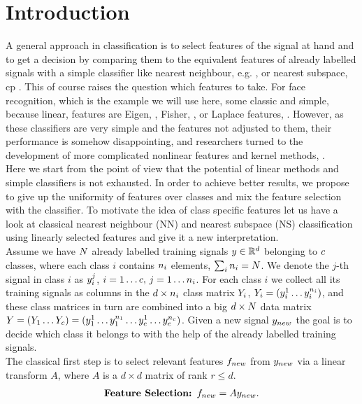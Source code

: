 \documentclass[11pt]{article}
\begin{document}
\section{Introduction}
A general approach in classification is to select features of the signal at hand and to get a decision by comparing them to the equivalent features of already labelled signals with a simple classifier like nearest neighbour, e.g. \cite{brpo93}, or nearest subspace, cp \cite{lehokr05}. This of course raises the question which features to take. For face recognition, which is the example we will use here, some classic and simple, because linear, features are Eigen, \cite{eigenfaces}, Fisher, \cite{lda}, or Laplace features, \cite{laplacefaces}.
However, as these classifiers are very simple and the features not adjusted to them, their performance is somehow disappointing, and researchers turned to the development of more complicated nonlinear features and kernel methods, \cite{liu06,phsc07}.\\
Here we start from the point of view that the potential of linear methods and simple classifiers is not exhausted. In order to achieve better results, we propose to give up the uniformity of features over classes and mix the feature selection with the classifier. To motivate the idea of class specific features let us have a look at classical nearest neighbour (NN) and nearest subspace (NS) classification using linearly selected features and give it a new interpretation.\\
Assume we have ${N}$ already labelled training signals ${y}\in{\mathbb{R}}^{d}$ belonging to ${c}$ classes, where each class $i$ contains ${n}_i$ elements, \ie $\sum_i {n}_i={N}$. We denote the $j$-th signal in class $i$ as ${y}_i^j$, $i=1\ldots {c}, \, j=1\ldots {n}_i$. For each class $i$ we collect all its training signals as columns in the ${d}\times {n}_i$ class matrix ${Y}_i$, \ie ${Y}_i=({y}_i^1\ldots {y}_i^{{n}_i})$, and these class matrices in turn are combined into a big ${d} \times {N}$ data matrix ${Y}=({Y}_1\ldots {Y}_{c}) = ({y}^1_1 \ldots {y}^{n_1}_1 \ldots {y}^1_{c} \ldots {y}^{n_{c}}_{c})$. Given a new signal ${{y}_{new}}$ the goal is to decide which class it belongs to with the help of the already labelled training signals.\\
The classical first step is to select relevant features ${{f}_{new}}$ from ${{y}_{new}}$ via a linear transform $A$, where $A$ is a $d\times d$ matrix of rank $r \leq d$.
\begin{align}
\mbox{\bf Feature Selection: } {{f}_{new}} = A {{y}_{new}}.
\end{align}
\end{document}
